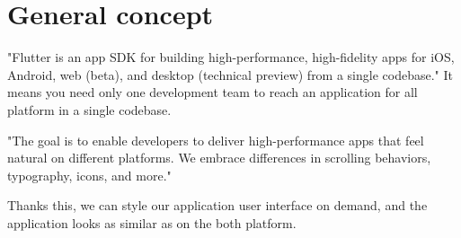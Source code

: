 \section{General concept}\label{sec:general-concept}
"Flutter is an app SDK for building high-performance, high-fidelity apps for iOS, Android, web (beta), and desktop (technical preview) from a single codebase."\cite{flutterTechnicalOverview}
It means you need only one development team to reach an application for all platform in a single codebase.

"The goal is to enable developers to deliver high-performance apps that feel natural on different platforms.
We embrace differences in scrolling behaviors, typography, icons, and more."\cite{flutterTechnicalOverview}

Thanks this, we can style our application user interface on demand, and the application looks as similar as on the both platform.

